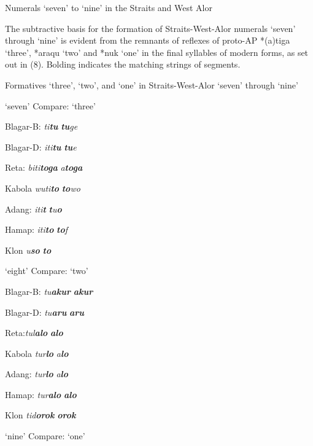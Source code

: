 {\begin{table}
\caption{Numerals `seven' to `nine' in the Straits and West Alor}
\end{table}

The subtractive basis for the formation of Straits-West-Alor numerals `seven' through `nine' is evident from the remnants of reflexes of proto-AP *(a)tiga `three', *araqu `two' and *nuk `one' in the final syllables of modern forms, as set out in (8). Bolding indicates the matching strings of segments.

Formatives `three', `two', and `one' in Straits-West-Alor `seven' through `nine'

\ea%
\label{ex:8}
\ea       `seven'     Compare:  `three'

Blagar-B:  \textit{ti}\textbf{\textit{tu}}          \textbf{\textit{tu}}\textit{ge}

Blagar-D:  \textit{{\texthtb}}\textit{iti}\textbf{\textit{tu}}         \textbf{\textit{tu}}\textit{e}

Reta:     \textit{biti}\textbf{\textit{toga}}\textbf{}      \textit{a}\textbf{\textit{toga}}

Kabola   \textit{wuti}\textbf{\textit{to}}        \textbf{\textit{to}}\textit{wo}\textbf{}

Adang:    \textit{iti}\textbf{\textit{t}}\textit{{\textopeno}}         \textbf{\textit{t}}\textit{u}\textbf{\textit{o}}

Hamap:  \textit{iti}\textbf{\textit{to}}           \textbf{\textit{to}}\textit{f}

Klon     \textit{u}\textbf{\textit{so{\ng}}}        \textbf{\textit{to{\ng}}}\textbf{}

\ex      `eight'    Compare:  `two'

Blagar-B:  \textit{tu}\textbf{\textit{akur}}         \textbf{\textit{akur}}

Blagar-D:  \textit{tu}\textbf{\textit{aru}}         \textbf{\textit{aru}}

Reta:\textit{tul}\textbf{\textit{alo}}        \textbf{\textit{alo}}

Kabola   \textit{tur}\textbf{\textit{lo}}          \textit{a}\textbf{\textit{lo}}\textbf{}

Adang:    \textit{tur}\textbf{\textit{lo}}          \textit{a}\textbf{\textit{lo}}

Hamap:  \textit{tur}\textbf{\textit{alo}}          \textbf{\textit{alo}}

Klon     \textit{tid}\textbf{\textit{orok}}       \textbf{\textit{orok}}\textbf{}

\ex      `nine'    Compare:   `one'

}
